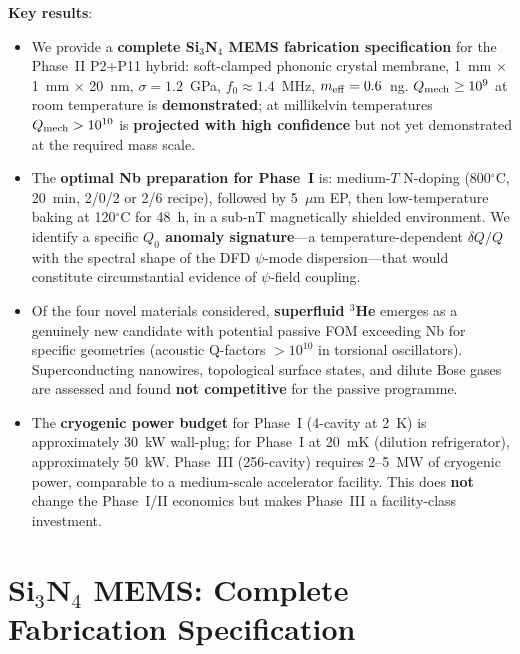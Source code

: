 \documentclass[11pt]{article}
\theoremstyle{definition}
\theoremstyle{remark}
\newcommand{\Qmech}{Q_{\rm mech}}
\begin{document}
\noindent\textbf{Key results}:
\begin{itemize}[nosep]
  \item We provide a \textbf{complete Si$_3$N$_4$ MEMS fabrication
    specification} for the Phase~II P2+P11 hybrid: soft-clamped
    phononic crystal membrane, 1~mm $\times$ 1~mm $\times$ 20~nm,
    $\sigma = 1.2$~GPa, $f_0 \approx 1.4$~MHz, $m_{\rm eff} = 0.6$~ng.
    $\Qmech \geq 10^9$ at room temperature is \textbf{demonstrated};
    at millikelvin temperatures $\Qmech > 10^{10}$ is \textbf{projected
    with high confidence} but not yet demonstrated at the required
    mass scale.
  \item The \textbf{optimal Nb preparation for Phase~I} is:
    medium-$T$ N-doping (800$^\circ$C, 20~min, 2/0/2 or 2/6 recipe),
    followed by 5~$\mu$m EP, then low-temperature baking at 120$^\circ$C
    for 48~h, in a sub-nT magnetically shielded environment. We identify
    a specific \textbf{$Q_0$ anomaly signature}---a
    temperature-dependent $\delta Q/Q$ with the spectral shape of the
    DFD $\psi$-mode dispersion---that would constitute circumstantial
    evidence of $\psi$-field coupling.
  \item Of the four novel materials considered, \textbf{superfluid $^3$He}
    emerges as a genuinely new candidate with potential passive FOM
    exceeding Nb for specific geometries (acoustic Q-factors $>10^{10}$
    in torsional oscillators). Superconducting nanowires, topological
    surface states, and dilute Bose gases are assessed and found
    \textbf{not competitive} for the passive programme.
  \item The \textbf{cryogenic power budget} for Phase~I (4-cavity at
    2~K) is approximately 30~kW wall-plug; for Phase~I at 20~mK
    (dilution refrigerator), approximately 50~kW. Phase~III
    (256-cavity) requires 2--5~MW of cryogenic power, comparable to
    a medium-scale accelerator facility. This does \textbf{not} change
    the Phase~I/II economics but makes Phase~III a facility-class
    investment.
\end{itemize}


\section{Si$_3$N$_4$ MEMS: Complete Fabrication Specification}
\label{sec:si3n4_spec}
\end{document}
